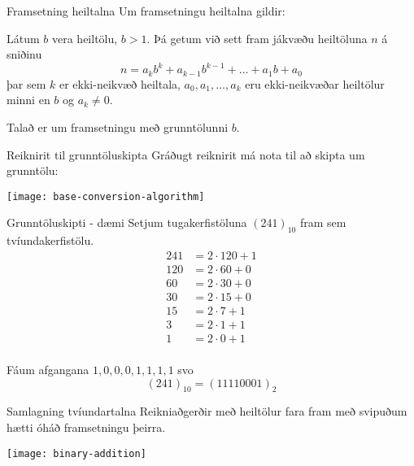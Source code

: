 \documentclass[handout]{beamer}
\begin{document}
\begin{frame}{Framsetning heiltalna}
Um framsetningu heiltalna gildir:

\begin{tcolorbox}[title=Framsetning heiltalna]
Látum $b$ vera heiltölu, $b > 1$. Þá getum við sett fram jákvæðu heiltöluna $n$ á sniðinu
\[
 n = a_kb^k + a_{k-1}b^{k-1} + \ldots + a_1b + a_0
\]
þar sem $k$ er ekki-neikvæð heiltala, $a_0, a_1, \ldots, a_k$ eru ekki-neikvæðar heiltölur minni en $b$ og $a_k \neq 0$.
\end{tcolorbox}
Talað er um framsetningu með grunntölunni $b$.
\end{frame}

\begin{frame}{Reiknirit til grunntöluskipta}
Gráðugt reiknirit má nota til að skipta um grunntölu:
\begin{center}
\texttt{[image: base-conversion-algorithm]}
\end{center}
\end{frame}

\begin{frame}{Grunntöluskipti - dæmi}
\vspace{0.5cm}
Setjum tugakerfistöluna $(241)_{10}$ fram sem tvíundakerfistölu.
\begin{align*}
241 &= 2 \cdot 120 + 1\\
120 &= 2 \cdot 60 + 0\\
60 &= 2 \cdot 30 + 0\\
30 &= 2 \cdot 15 + 0\\
15 &= 2 \cdot 7 + 1\\
3 &= 2 \cdot 1 + 1\\
1&= 2 \cdot 0 + 1\\
\end{align*}

\vspace{-0.8cm}
Fáum afgangana $1, 0, 0, 0, 1, 1, 1, 1$ svo
\[
 (241)_{10} = (11110001)_2
\]
\end{frame}

\begin{frame}{Samlagning tvíundartalna}
Reikniaðgerðir með heiltölur fara fram með svipuðum hætti óháð framsetningu þeirra.
\begin{center}
\texttt{[image: binary-addition]}
\end{center}
\end{frame}
\end{document}

